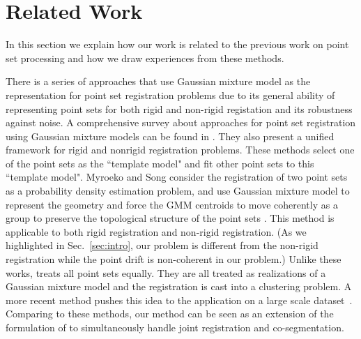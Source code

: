 \section{Related Work}
\label{sec:rw}
In this section we explain how our work is related to the previous work on point set processing and how we draw experiences from these methods. 

There is a series of approaches that use Gaussian mixture model as the representation for point set registration problems due to its general ability of representing point sets for both rigid and non-rigid registation and its robustness against noise.
%
A comprehensive survey about approaches for point set registration using Gaussian mixture models can be found in \cite{GMM_PAMI}. 
They also present a unified framework for rigid and nonrigid registration problems. 
%
These methods select one of the point sets as the ``template model" and fit other point sets to this ``template model".
%
Myroeko and Song consider the registration of two point sets as a probability density estimation problem, and use Gaussian mixture model to represent the geometry and force the GMM centroids to move coherently as a group to preserve the topological structure of the point sets \cite{CPD}. This method is applicable to both rigid registration and non-rigid registration.  
%
(As we highlighted in Sec.~\ref{sec:intro}, our problem is different from the non-rigid registration while the point drift is non-coherent in our problem.)
%
Unlike these works, \cite{Evangelidis2014} treats all point sets equally.
They are all treated as realizations of a Gaussian mixture model and the registration is cast into a clustering problem. 
A more recent method pushes this idea to the application on a large scale dataset~\cite{GOGMA}. 
Comparing to these methods, our method can be seen as an extension of the formulation of \cite{Evangelidis2014} to simultaneously handle joint registration and co-segmentation. 
 

